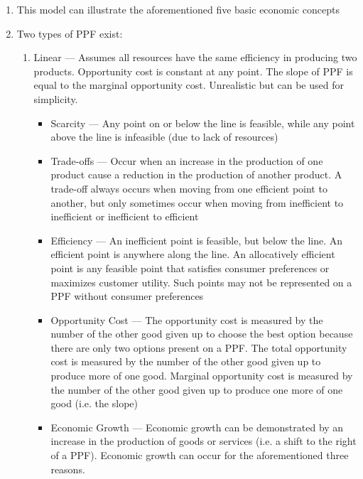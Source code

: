 \documentclass[12pt]{article}
\begin{document}
\begin{enumerate}
\begin{enumerate}
\begin{enumerate}
\begin{enumerate}
                \end{enumerate}

              \item This model can illustrate the aforementioned five basic economic concepts

              \item Two types of PPF exist:

                \begin{enumerate}

                  \item Linear — Assumes all resources have the same efficiency in producing two products. Opportunity cost is constant at any point. The slope of PPF is equal to the marginal opportunity cost. Unrealistic but can be used for simplicity.

                    \begin{itemize}

                      \item Scarcity — Any point on or below the line is feasible, while any point above the line is infeasible (due to lack of resources)

                      \item Trade-offs — Occur when an increase in the production of one product cause a reduction in the production of another product. A trade-off always occurs when moving from one efficient point to another, but only sometimes occur when moving from inefficient to inefficient or inefficient to efficient

                      \item Efficiency — An inefficient point is feasible, but below the line. An efficient point is anywhere along the line. An allocatively efficient point is any feasible point that satisfies consumer preferences or maximizes customer utility. Such points may not be represented on a PPF without consumer preferences

                      \item Opportunity Cost — The opportunity cost is measured by the number of the other good given up to choose the best option because there are only two options present on a PPF. The total opportunity cost is measured by the number of the other good given up to produce more of one good. Marginal opportunity cost is measured by the number of the other good given up to produce one more of one good (i.e. the slope)

                      \item Economic Growth — Economic growth can be demonstrated by an increase in the production of goods or services (i.e. a shift to the right of a PPF). Economic growth can occur for the aforementioned three reasons.


\end{itemize}
\end{enumerate}
\end{enumerate}
\end{enumerate}
\end{enumerate}
\end{document}
